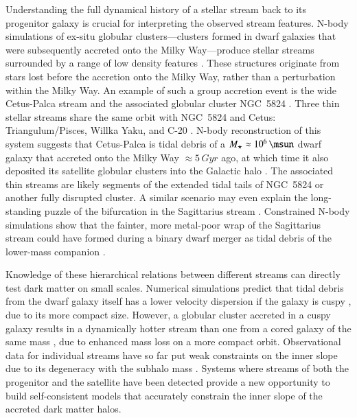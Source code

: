 \documentclass[final,5p,times,twocolumn,authoryear]{elsarticle}
\begin{document}
Understanding the full dynamical history of a stellar stream back to its progenitor galaxy is crucial for interpreting the observed stream features.
N-body simulations of ex-situ globular clusters---clusters formed in dwarf galaxies that were subsequently accreted onto the Milky Way---produce stellar streams surrounded by a range of low density features \citep[e.g., wide envelopes, or cocoons, and/or sub-streams;][]{carlberg:2018,carlberg:2020,malhan:2019a,qian:2022}.
These structures originate from stars lost before the accretion onto the Milky Way, rather than a perturbation within the Milky Way.
An example of such a group accretion event is the wide Cetus-Palca stream and the associated globular cluster NGC~5824 \citep{yuan:2019,thomas:2022}.
Three thin stellar streams share the same orbit with NGC~5824 and Cetus: Triangulum/Pisces, Willka Yaku, and C-20 \citep{bonaca:2021, yuan:2022}.
N-body reconstruction of this system suggests that Cetus-Palca is tidal debris of a $M_\star\approx10^6\,\unit{\msun}$ dwarf galaxy that accreted onto the Milky Way $\approx5\,\unit{Gyr}$ ago, at which time it also deposited its satellite globular clusters into the Galactic halo \citep{chang:2020}.
The associated thin streams are likely segments of the extended tidal tails of NGC~5824 or another fully disrupted cluster.
A similar scenario may even explain the long-standing puzzle of the bifurcation in the Sagittarius stream \citep{Belokurov:2006, koposov:2012}.
Constrained N-body simulations show that the fainter, more metal-poor wrap of the Sagittarius stream \citep[e.g.,][]{ramos:2022} could have formed during a binary dwarf merger as tidal debris of the lower-mass companion \citep{davies:2024a,davies:2024b}.

Knowledge of these hierarchical relations between different streams can directly test dark matter on small scales.
Numerical simulations predict that tidal debris from the dwarf galaxy itself has a lower velocity dispersion if the galaxy is cuspy \citep{errani:2015}, due to its more compact size.
However, a globular cluster accreted in a cuspy galaxy results in a dynamically hotter stream than one from a cored galaxy of the same mass \citep{malhan:2021}, due to enhanced mass loss on a more compact orbit.
Observational data for individual streams have so far put weak constraints on the inner slope due to its degeneracy with the subhalo mass \citep{malhan:2022b}.
Systems where streams of both the progenitor and the satellite have been detected provide a new opportunity to build self-consistent models that accurately constrain the inner slope of the accreted dark matter halos.
\end{document}

